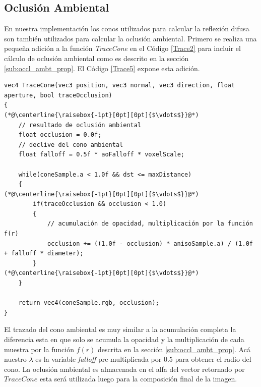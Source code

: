 \subsection{Oclusión Ambiental} %
\label{sub:oclusion_ambient}
En nuestra implementación los conos utilizados para calcular la reflexión difusa son también utilizados para calcular la oclusión ambiental. Primero se realiza una pequeña adición a la función \emph{TraceCone} en el Código \ref{Trace2} para incluir el cálculo de oclusión ambiental como es descrito en la sección \ref{sub:occl_ambt_prop}. El Código \ref{Trace5} expone esta adición.
\\
\begin{lstlisting}[caption={Oclusión ambiental para el algoritmo de trazado de conos.}, label=Trace5]
vec4 TraceCone(vec3 position, vec3 normal, vec3 direction, float aperture, bool traceOcclusion)
{
(*@\centerline{\raisebox{-1pt}[0pt][0pt]{$\vdots$}}@*)
    // resultado de oclusión ambiental
    float occlusion = 0.0f;
    // declive del cono ambiental
    float falloff = 0.5f * aoFalloff * voxelScale;

    while(coneSample.a < 1.0f && dst <= maxDistance)
    {
(*@\centerline{\raisebox{-1pt}[0pt][0pt]{$\vdots$}}@*)
        if(traceOcclusion && occlusion < 1.0)
        {
            // acumulación de opacidad, multiplicación por la función f(r)
            occlusion += ((1.0f - occlusion) * anisoSample.a) / (1.0f + falloff * diameter);
        }
(*@\centerline{\raisebox{-1pt}[0pt][0pt]{$\vdots$}}@*)
    }

    return vec4(coneSample.rgb, occlusion);
}
\end{lstlisting}

El trazado del cono ambiental es muy similar a la acumulación completa la diferencia esta en que solo se acumula la opacidad y la multiplicación de cada muestra por la función $f(r)$ descrita en la sección \ref{sub:occl_ambt_prop}. Acá nuestro $\lambda$ es la variable \emph{falloff} pre-multiplicada por $0.5$ para obtener el radio del cono. La oclusión ambiental es almacenada en el alfa del vector retornado por $TraceCone$ esta será utilizada luego para la composición final de la imagen.

